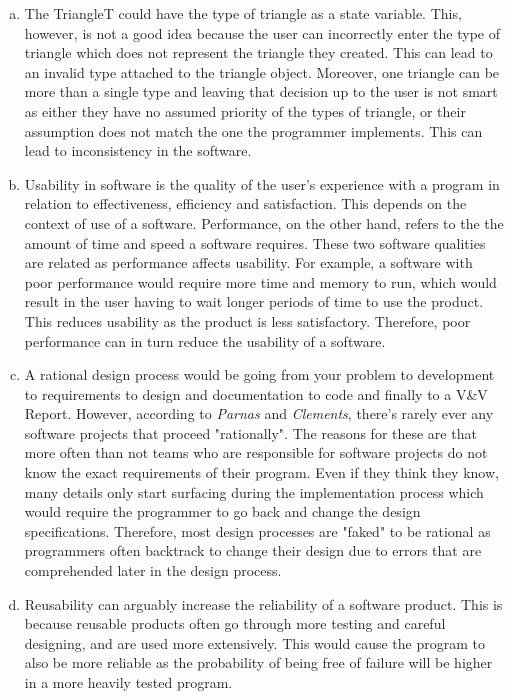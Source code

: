 \documentclass[12pt]{article}
\begin{document}
\begin{enumerate}[(a)]
\item The TriangleT could have the type of triangle as a state variable. This, however, is not a good idea because the user can incorrectly enter the type of triangle which does not represent the triangle they created. This can lead to an invalid type attached to the triangle object. Moreover, one triangle can be more than a single type and leaving that decision up to the user is not smart as either they have no assumed priority of the types of triangle, or their assumption does not match the one the programmer implements. This can lead to inconsistency in the software.
\item Usability in software is the quality of the user's experience with a program in relation to effectiveness, efficiency and satisfaction. This depends on the context of use of a software. Performance, on the other hand, refers to the the amount of time and speed a software requires. These two software qualities are related as performance affects usability. For example, a software with poor performance would require more time and memory to run, which would result in the user having to wait longer periods of time to use the product. This reduces usability as the product is less satisfactory. Therefore, poor performance can in turn reduce the usability of a software.
\item A rational design process would be going from your problem to development to requirements to design and documentation to code and finally to a V\&V Report. However, according to \emph{Parnas} and \emph{Clements}, there's rarely ever any software projects that proceed "rationally". The reasons for these are that more often than not teams who are responsible for software projects do not know the exact requirements of their program. Even if they think they know, many details only start surfacing during the implementation process which would require the programmer to go back and change the design specifications. Therefore, most design processes are "faked" to be rational as programmers often backtrack to change their design due to errors that are comprehended later in the design process.
\item Reusability can arguably increase the reliability of a software product. This is because reusable products often go through more testing and careful designing, and are used more extensively. This would cause the program to also be more reliable as the probability of being free of failure will be higher in a more heavily tested program.

\end{enumerate}
\end{document}
